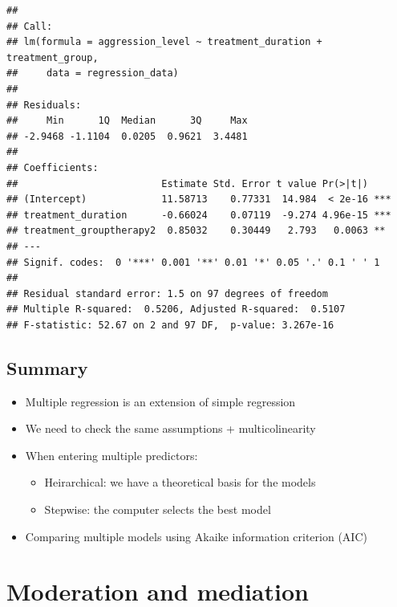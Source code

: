\documentclass[
]{book}
\providecommand{\tightlist}{%
  \setlength{\itemsep}{0pt}\setlength{\parskip}{0pt}}
\begin{document}
\begin{verbatim}
## 
## Call:
## lm(formula = aggression_level ~ treatment_duration + treatment_group, 
##     data = regression_data)
## 
## Residuals:
##     Min      1Q  Median      3Q     Max 
## -2.9468 -1.1104  0.0205  0.9621  3.4481 
## 
## Coefficients:
##                         Estimate Std. Error t value Pr(>|t|)    
## (Intercept)             11.58713    0.77331  14.984  < 2e-16 ***
## treatment_duration      -0.66024    0.07119  -9.274 4.96e-15 ***
## treatment_grouptherapy2  0.85032    0.30449   2.793   0.0063 ** 
## ---
## Signif. codes:  0 '***' 0.001 '**' 0.01 '*' 0.05 '.' 0.1 ' ' 1
## 
## Residual standard error: 1.5 on 97 degrees of freedom
## Multiple R-squared:  0.5206, Adjusted R-squared:  0.5107 
## F-statistic: 52.67 on 2 and 97 DF,  p-value: 3.267e-16
\end{verbatim}

\hypertarget{summary}{%
\section{Summary}\label{summary}}

\begin{itemize}
\tightlist
\item
  Multiple regression is an extension of simple regression
\item
  We need to check the same assumptions + multicolinearity
\item
  When entering multiple predictors:

  \begin{itemize}
  \tightlist
  \item
    Heirarchical: we have a theoretical basis for the models
  \item
    Stepwise: the computer selects the best model
  \end{itemize}
\item
  Comparing multiple models using Akaike information criterion (AIC)
\end{itemize}

\hypertarget{moderation-and-mediation}{%
\chapter{Moderation and mediation}\label{moderation-and-mediation}}

  
\end{document}
